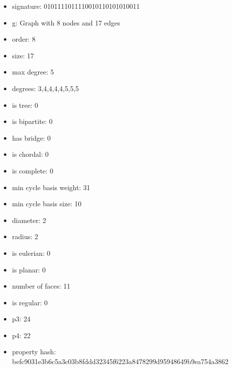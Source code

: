 \begin{itemize}
\item signature: 0101111011110010110101010011
\item g: Graph with 8 nodes and 17 edges
\item order: 8
\item size: 17
\item max degree: 5
\item degrees: 3,4,4,4,4,5,5,5
\item is tree: 0
\item is bipartite: 0
\item has bridge: 0
\item is chordal: 0
\item is complete: 0
\item min cycle basis weight: 31
\item min cycle basis size: 10
\item diameter: 2
\item radius: 2
\item is eulerian: 0
\item is planar: 0
\item number of faces: 11
\item is regular: 0
\item p3: 24
\item p4: 22
\item property hash: befc9031e3b6c5a3c03b8fddd32345f6223a8478299d95948649b9ea754a3862
\end{itemize}
\newpage
\begin{figure}
\end{figure}
